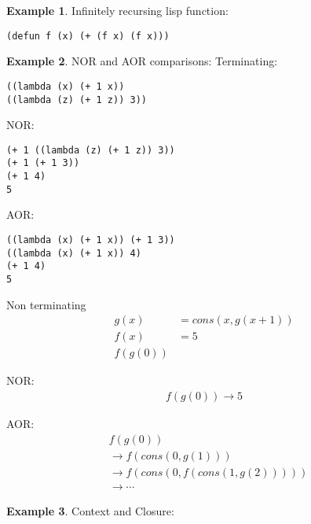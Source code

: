 \documentclass[landscape, letterpaper]{extarticle}
\theoremstyle{definition}
\newtheorem{example}{Example}
\begin{document}
\begin{multicols}{3}
    \begin{example}
        Infinitely recursing lisp function:

        \begin{verbatim}
(defun f (x) (+ (f x) (f x)))
        \end{verbatim}
    \end{example}

    \begin{example}
        NOR and AOR comparisons:
        Terminating:
        \begin{verbatim}
((lambda (x) (+ 1 x))
((lambda (z) (+ 1 z)) 3))
        \end{verbatim}

        NOR:\@
        \begin{verbatim}
(+ 1 ((lambda (z) (+ 1 z)) 3))
(+ 1 (+ 1 3))
(+ 1 4)
5
        \end{verbatim}

        AOR:\@
        \begin{verbatim}
((lambda (x) (+ 1 x)) (+ 1 3))
((lambda (x) (+ 1 x)) 4)
(+ 1 4)
5
        \end{verbatim}

        Non terminating
        \begin{align*}
            g(x) & = cons(x, g(x+1)) \\
            f(x) & = 5               \\
            f(g(0))
        \end{align*}

        NOR:\@
        \begin{align*}
            f(g(0)) \rightarrow 5
        \end{align*}

        AOR:\@
        \begin{align*}
             & f(g(0))                                  \\
             & \rightarrow f(cons(0, g(1)))             \\
             & \rightarrow f(cons(0, f(cons(1, g(2))))) \\              & \rightarrow\cdots
        \end{align*}
    \end{example}

    \begin{example}
        Context and Closure:


\end{example}
\end{multicols}
\end{document}
